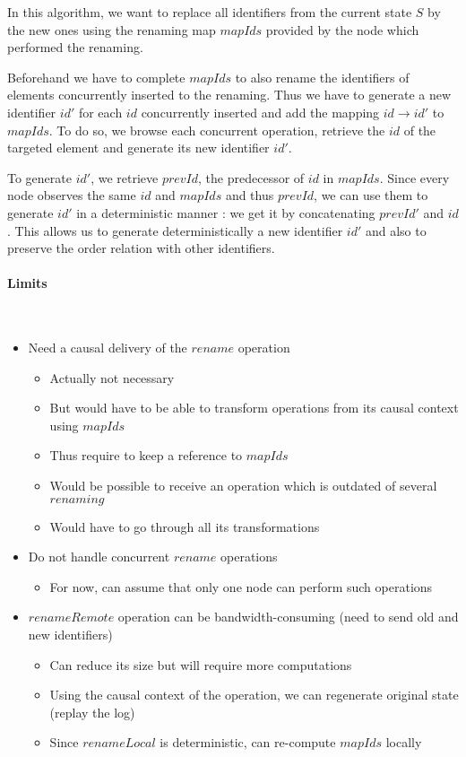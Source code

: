 \documentclass[a4paper]{article}
\begin{document}
In this algorithm, we want to replace all identifiers from the current state $S$
by the new ones using the renaming map $mapIds$ provided by the node which
performed the renaming.


Beforehand we have to complete $mapIds$ to also rename the identifiers of elements
concurrently inserted to the renaming. Thus we have to generate a new identifier
$id'$ for each $id$ concurrently inserted and add the mapping $id \to id'$ to $mapIds$.
To do so, we browse each concurrent operation, retrieve the $id$ of the targeted
element and generate its new identifier $id'$.


To generate $id'$, we retrieve $prevId$, the predecessor of $id$ in $mapIds$.
Since every node observes the same $id$ and $mapIds$ and thus $prevId$, we can use them to
generate $id'$ in a deterministic manner : we get it by concatenating $prevId'$ and $id$.
This allows us to generate deterministically a new identifier $id'$
and also to preserve the order relation with other identifiers.

\paragraph{Limits}~\\

\begin{itemize}
  \item Need a causal delivery of the $rename$ operation
  \begin{itemize}
    \item Actually not necessary
    \item But would have to be able to transform operations from its causal context using $mapIds$
    \item Thus require to keep a reference to $mapIds$
    \item Would be possible to receive an operation which is outdated of several $renaming$
    \item Would have to go through all its transformations
  \end{itemize}
  \item Do not handle concurrent $rename$ operations
  \begin{itemize}
    \item For now, can assume that only one node can perform such operations
  \end{itemize}
  \item $renameRemote$ operation can be bandwidth-consuming (need to send old and new identifiers)
  \begin{itemize}
    \item Can reduce its size but will require more computations
    \item Using the causal context of the operation, we can regenerate original state (replay the log)
    \item Since $renameLocal$ is deterministic, can re-compute $mapIds$ locally
  \end{itemize}
\end{itemize}
\end{document}
